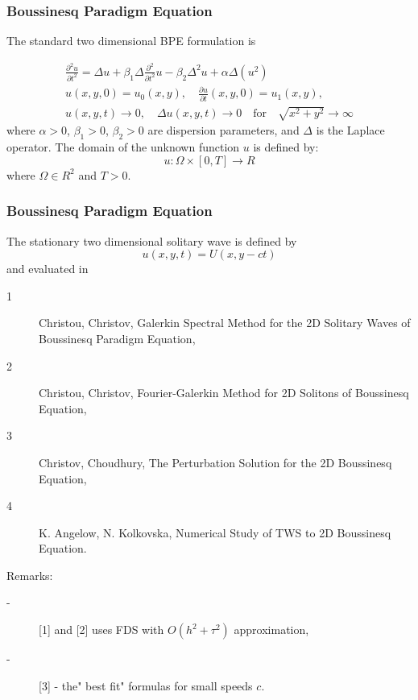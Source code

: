 \documentclass{beamer}
\newcommand{\be}{\begin{equation}}
\newcommand{\ee}{\end{equation}}
\begin{document}
\begin{frame}
\frametitle{Boussinesq Paradigm Equation}


The standard two dimensional BPE formulation is

\begin{align}\label{problem}
 \frac{\partial^2 u}{\partial t^2}= \Delta u + \beta_1 \Delta \frac{\partial^2}{\partial t^2} u -  \beta_2 \Delta^2 u +  \alpha \Delta (u^2)
\\
u(x,y,0) = u_0(x,y), \quad \frac{\partial u}{\partial t}(x,y,0)=u_1(x,y), \nonumber
\\
u(x,y,t) \rightarrow 0, \quad \Delta u(x,y, t) \rightarrow 0 \quad \text{for} \quad \sqrt{x^2+y^2} \rightarrow \infty \nonumber
\end{align}
where $\alpha>0$, $\beta_1>0$, $\beta_2>0$  are dispersion parameters, and $\Delta$ is the Laplace operator. The domain of the unknown function $u$ is defined by:
\be
 u:\Omega \times [0, T] \rightarrow R
\ee
where $\Omega \in R^2$ and $T>0$.
\end{frame}


\begin{frame}
\frametitle{Boussinesq Paradigm Equation}


The stationary two dimensional solitary wave is defined by
$$u(x, y, t) = U(x, y-ct)$$
and evaluated in 
\begin{description}
 \item[1] Christou, Christov, Galerkin Spectral Method for the 2D Solitary Waves of Boussinesq Paradigm Equation, 
 \item[2] Christou, Christov, Fourier-Galerkin Method for 2D Solitons of Boussinesq Equation, 
  \item[3] Christov, Choudhury, The Perturbation Solution for the 2D Boussinesq Equation,
  \item[4] K. Angelow, N. Kolkovska, Numerical Study of TWS to 2D Boussinesq Equation.
\end{description}

Remarks:
\begin{description}
 \item[-] [1] and [2] uses FDS with $O(h^2 + \tau^2)$ approximation, 
  \item[-] [3] - the" best fit" formulas for small speeds $c$.
\end{description}
\end{frame}
\end{document}
